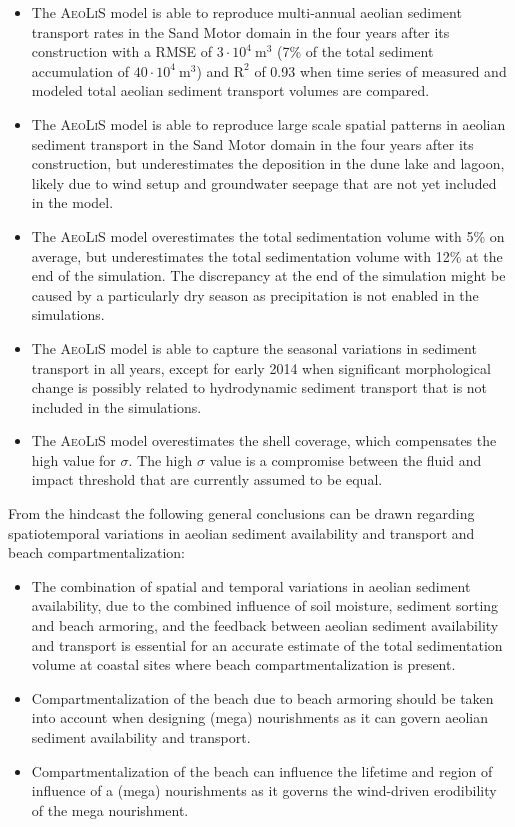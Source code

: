\begin{itemize}
\item The \textsc{AeoLiS} model is able to reproduce multi-annual
  aeolian sediment transport rates in the Sand Motor domain in the
  four years after its construction with a RMSE of $3 \cdot 10^4 ~
  \mathrm{m^3}$ (7\% of the total sediment accumulation of $40 \cdot
  10^4 ~ \mathrm{m^3}$) and $\mathrm{R^2}$ of 0.93 when time series of
  measured and modeled total aeolian sediment transport volumes are
  compared.
\item The \textsc{AeoLiS} model is able to reproduce large scale
  spatial patterns in aeolian sediment transport in the Sand Motor
  domain in the four years after its construction, but underestimates
  the deposition in the dune lake and lagoon, likely due to wind setup
  and groundwater seepage that are not yet included in the model.
\item The \textsc{AeoLiS} model overestimates the total sedimentation
  volume with 5\% on average, but underestimates the total
  sedimentation volume with 12\% at the end of the simulation. The
  discrepancy at the end of the simulation might be caused by a
  particularly dry season as precipitation is not enabled in the
  simulations.
\item The \textsc{AeoLiS} model is able to capture the seasonal
  variations in sediment transport in all years, except for early 2014
  when significant morphological change is possibly related to
  hydrodynamic sediment transport that is not included in the
  simulations.
\item The \textsc{AeoLiS} model overestimates the shell coverage,
  which compensates the high value for $\sigma$. The high $\sigma$
  value is a compromise between the fluid and impact threshold that
  are currently assumed to be equal.
\end{itemize}

\noindent From the hindcast the following general conclusions can be
drawn regarding spatiotemporal variations in aeolian sediment
availability and transport and beach compartmentalization:

\begin{itemize}
\item The combination of spatial and temporal variations in aeolian
  sediment availability, due to the combined influence of soil
  moisture, sediment sorting and beach armoring, and the feedback
  between aeolian sediment availability and transport is essential for
  an accurate estimate of the total sedimentation volume at coastal
  sites where beach compartmentalization is present.
\item Compartmentalization of the beach due to beach armoring should
  be taken into account when designing (mega) nourishments as it
  can govern aeolian sediment availability and transport.
\item Compartmentalization of the beach can influence the lifetime and
  region of influence of a (mega) nourishments as it governs the
  wind-driven erodibility of the mega nourishment.
\end{itemize}

